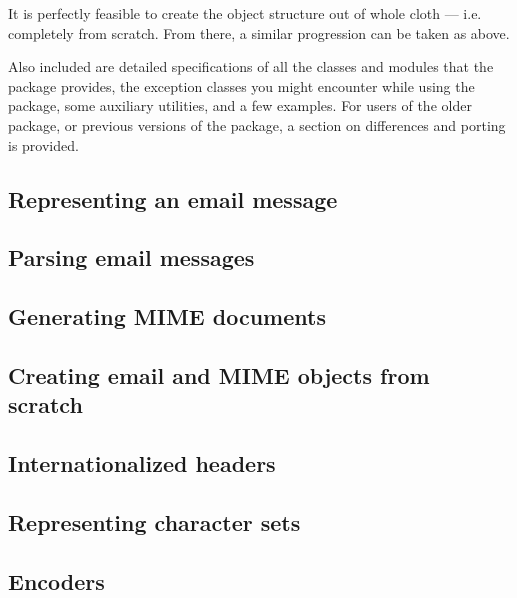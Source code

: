 It is perfectly feasible to create the object structure out of whole
cloth --- i.e. completely from scratch.  From there, a similar
progression can be taken as above.

Also included are detailed specifications of all the classes and
modules that the  package provides, the exception
classes you might encounter while using the  package,
some auxiliary utilities, and a few examples.  For users of the older
 package, or previous versions of the 
package, a section on differences and porting is provided.

\begin{seealso}
\end{seealso}

\subsection{Representing an email message}


\subsection{Parsing email messages}


\subsection{Generating MIME documents}


\subsection{Creating email and MIME objects from scratch}


\subsection{Internationalized headers}


\subsection{Representing character sets}


\subsection{Encoders}


